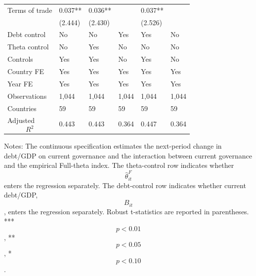 \begin{table}[H]
\begin{threeparttable}
\begin{tabularx}{\textwidth}{lYYYYY}
Terms of trade & 0.037** & 0.036** &  & 0.037** &  \\
  & (2.444) & (2.430) &  & (2.526) &  \\
\midrule
Debt control & No & No & Yes & Yes & No \\
Theta control & No & Yes & No & No & No \\
Controls & Yes & Yes & No & Yes & No \\
Country FE & Yes & Yes & Yes & Yes & Yes \\
Year FE & Yes & Yes & Yes & Yes & Yes \\
Observations & 1,044 & 1,044 & 1,044 & 1,044 & 1,044 \\
Countries & 59 & 59 & 59 & 59 & 59 \\
Adjusted $$R^2$$ & 0.443 & 0.443 & 0.364 & 0.447 & 0.364 \\
\bottomrule
\end{tabularx}
\begin{tablenotes}[flushleft]\footnotesize
\item Notes: The continuous specification estimates the next-period change in debt/GDP on current governance and the interaction between current governance and the empirical Full-theta index. The theta-control row indicates whether $$\widehat{\theta}^{F}_{it}$$ enters the regression separately. The debt-control row indicates whether current debt/GDP, $$B_{it}$$, enters the regression separately. Robust t-statistics are reported in parentheses. *** $$p<0.01$$, ** $$p<0.05$$, * $$p<0.10$$.
\end{tablenotes}
\end{threeparttable}
\end{table}
